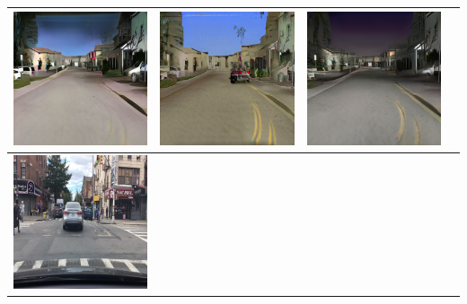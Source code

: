 \documentclass{VUMIFPSkursinis}
\begin{document}
\begin{table}[H]
{\begin{tabular}{|c|c|c|c|}
                \includegraphics[scale=0.35]{img/pvz/3_cycle} & \includegraphics[scale=0.35]{img/pvz/3_cut} & \includegraphics[scale=0.35]{img/pvz/3_mspc}
                \\
                \hline
                \includegraphics[scale=0.35]{img/pvz/4_real} & 

\end{tabular}}
\end{table}
\end{document}
